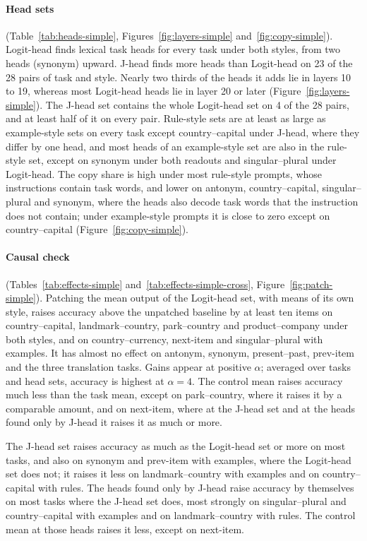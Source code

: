 \documentclass[11pt,a4paper]{article}
\begin{document}
\paragraph{Head sets} (Table~\ref{tab:heads-simple}, Figures~\ref{fig:layers-simple} and~\ref{fig:copy-simple}). Logit-head finds lexical task heads for every task under both styles, from two heads (synonym) upward. J-head finds more heads than Logit-head on 23 of the 28 pairs of task and style. Nearly two thirds of the heads it adds lie in layers 10 to 19, whereas most Logit-head heads lie in layer 20 or later (Figure~\ref{fig:layers-simple}). The J-head set contains the whole Logit-head set on 4 of the 28 pairs, and at least half of it on every pair. Rule-style sets are at least as large as example-style sets on every task except country--capital under J-head, where they differ by one head, and most heads of an example-style set are also in the rule-style set, except on synonym under both readouts and singular--plural under Logit-head. The copy share is high under most rule-style prompts, whose instructions contain task words, and lower on antonym, country--capital, singular--plural and synonym, where the heads also decode task words that the instruction does not contain; under example-style prompts it is close to zero except on country--capital (Figure~\ref{fig:copy-simple}).

\paragraph{Causal check} (Tables~\ref{tab:effects-simple} and~\ref{tab:effects-simple-cross}, Figure~\ref{fig:patch-simple}). Patching the mean output of the Logit-head set, with means of its own style, raises accuracy above the unpatched baseline by at least ten items on country--capital, landmark--country, park--country and product--company under both styles, and on country--currency, next-item and singular--plural with examples. It has almost no effect on antonym, synonym, present--past, prev-item and the three translation tasks. Gains appear at positive $\alpha$; averaged over tasks and head sets, accuracy is highest at $\alpha=4$. The control mean raises accuracy much less than the task mean, except on park--country, where it raises it by a comparable amount, and on next-item, where at the J-head set and at the heads found only by J-head it raises it as much or more.

The J-head set raises accuracy as much as the Logit-head set or more on most tasks, and also on synonym and prev-item with examples, where the Logit-head set does not; it raises it less on landmark--country with examples and on country--capital with rules. The heads found only by J-head raise accuracy by themselves on most tasks where the J-head set does, most strongly on singular--plural and country--capital with examples and on landmark--country with rules. The control mean at those heads raises it less, except on next-item.
\end{document}
